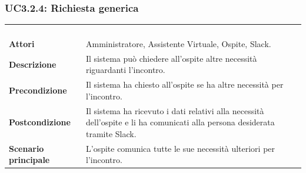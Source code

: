 \subsubsection{UC3.2.4: Richiesta generica}
\label{UC3.2.4}
\begin{longtable}{l|p{10cm}}
\rowcolor[gray]{0.8} \multicolumn{2}{c}{} \\
\rowcolor[gray]{0.8} \multicolumn{2}{c}{\textbf{UC3.2.4 - Richiesta generica}} \\
\rowcolor[gray]{0.8} \multicolumn{2}{c}{} \\
\hline
&\\
\textbf{Attori} & Amministratore, Assistente Virtuale, Ospite, Slack.\\[7pt]
\textbf{Descrizione} & Il sistema può chiedere all'ospite altre necessità riguardanti l'incontro.\\[7pt]
\textbf{Precondizione} & Il sistema ha chiesto all'ospite se ha altre necessità per l'incontro.\\[7pt]
\textbf{Postcondizione} & Il sistema ha ricevuto i dati relativi alla necessità dell'ospite e li ha comunicati alla persona desiderata tramite Slack.\\[7pt]
\textbf{Scenario principale} &L'ospite comunica tutte le sue necessità ulteriori per l'incontro.\\[7pt]\hline
\end{longtable}

